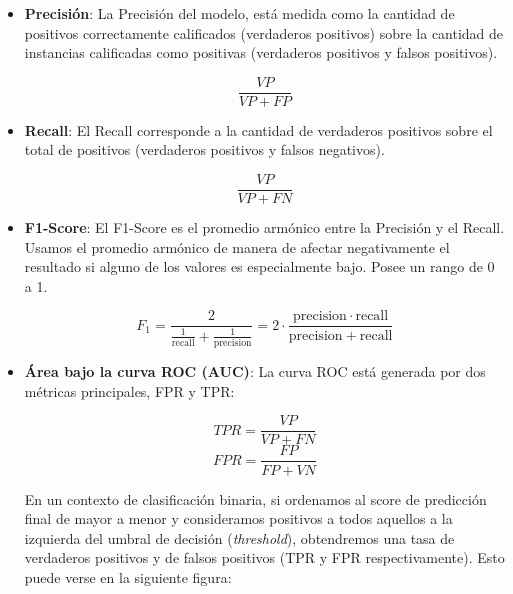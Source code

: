 \begin{itemize}
    \item \textbf{Precisión}: La Precisión del modelo, está medida como la cantidad de positivos correctamente calificados (verdaderos positivos) sobre la cantidad de instancias calificadas como positivas (verdaderos positivos y falsos positivos).
    
    \begin{equation*}
        \frac{VP}{VP + FP}
    \end{equation*}
    
    \item \textbf{Recall}: El Recall corresponde a la cantidad de verdaderos positivos sobre el total de positivos (verdaderos positivos y falsos negativos).
    
    \begin{equation*}
        \frac{VP}{VP + FN}
    \end{equation*}
    
    \item \textbf{F1-Score}: El F1-Score es el promedio armónico entre la Precisión y el Recall. Usamos el promedio armónico de manera de afectar negativamente el resultado si alguno de los valores es especialmente bajo. Posee un rango de 0 a 1. 
    
    \begin{equation*}
        F_1 = \frac{2}{\tfrac{1}{\mathrm{recall}} + \tfrac{1}{\mathrm{precision}}} = 2 \cdot \frac{\mathrm{precision} \cdot \mathrm{recall}}{\mathrm{precision} + \mathrm{recall}}
    \end{equation*}
    
    
    \item \textbf{Área bajo la curva ROC (AUC)}: La curva ROC está generada por dos métricas principales, FPR y TPR:
    
    \begin{multicols}{2}
        \begin{equation*}
        TPR = \frac{VP}{VP + FN}
        \end{equation*}
        \break
        \begin{equation*}
        FPR = \frac{FP}{FP + VN} 
        \end{equation*}
    \end{multicols}
    
    En un contexto de clasificación binaria, si ordenamos al score de predicción final de mayor a menor y consideramos positivos a todos aquellos a la izquierda del umbral de decisión (\textit{threshold}), obtendremos una tasa de verdaderos positivos y de falsos positivos (TPR y FPR respectivamente). Esto puede verse en la siguiente figura:
    

\end{itemize}
